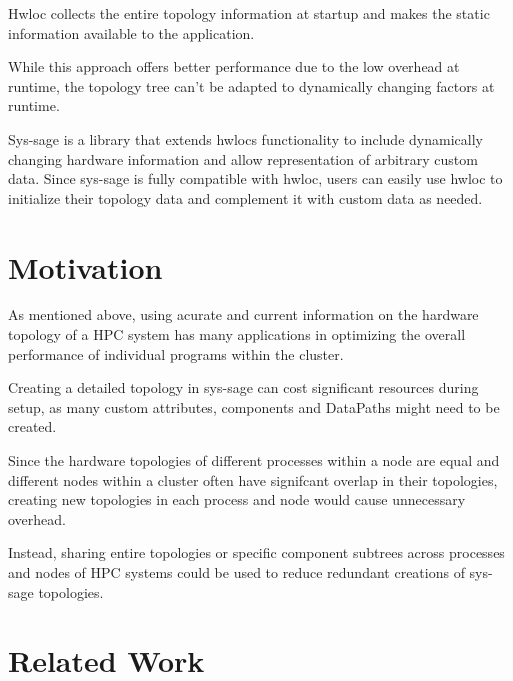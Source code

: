 Hwloc collects the entire topology information at startup and makes the static information available to the application. \cite{hwloc_paper}

While this approach offers better performance due to the low overhead at runtime, the topology tree can't be adapted to dynamically changing factors at runtime.

Sys-sage \cite{sys-sage} is a library that extends hwlocs functionality to include dynamically changing hardware information and allow representation of arbitrary custom data.
Since sys-sage is fully compatible with hwloc, users can easily use hwloc to initialize their topology data and complement it with custom data as needed.

\section{Motivation}
As mentioned above, using acurate and current information on the hardware topology of a HPC system
has many applications in optimizing the overall performance of individual programs within the cluster.

Creating a detailed topology in sys-sage can cost significant resources during setup, as many custom attributes, components and DataPaths might need to be created.

Since the hardware topologies of different processes within a node are equal
and different nodes within a cluster often have signifcant overlap in their topologies, creating new topologies in each process and node would cause unnecessary overhead.

Instead, sharing entire topologies or specific component subtrees across processes and nodes of HPC systems could be used to reduce redundant creations of sys-sage topologies.


\section{Related Work}